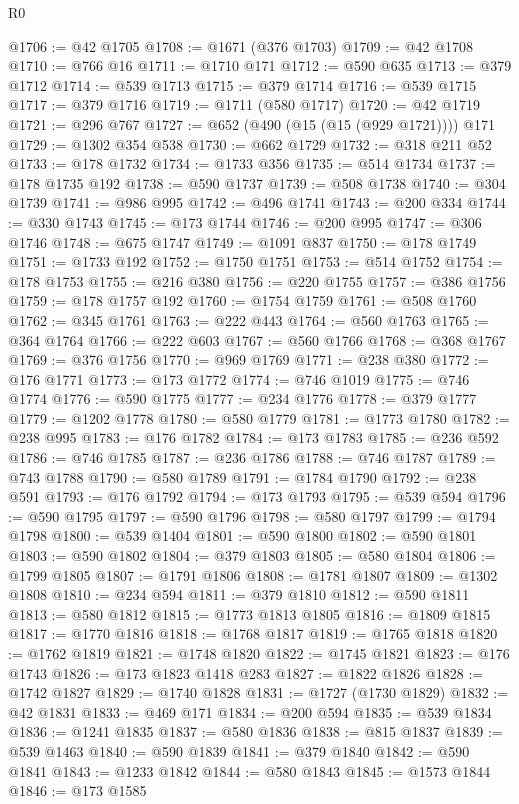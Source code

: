 \begin{lexlean}{R0}
\begin{coremodule}
@1706 := @42 @1705
@1708 := @1671 (@376 @1703)
@1709 := @42 @1708
@1710 := @766 @16
@1711 := @1710 @171
@1712 := @590 @635
@1713 := @379 @1712
@1714 := @539 @1713
@1715 := @379 @1714
@1716 := @539 @1715
@1717 := @379 @1716
@1719 := @1711 (@580 @1717)
@1720 := @42 @1719
@1721 := @296 @767
@1727 := @652 (@490 (@15 (@15 (@929 @1721)))) @171
@1729 := @1302 @354 @538
@1730 := @662 @1729
@1732 := @318 @211 @52
@1733 := @178 @1732
@1734 := @1733 @356
@1735 := @514 @1734
@1737 := @178 @1735 @192
@1738 := @590 @1737
@1739 := @508 @1738
@1740 := @304 @1739
@1741 := @986 @995
@1742 := @496 @1741
@1743 := @200 @334
@1744 := @330 @1743
@1745 := @173 @1744
@1746 := @200 @995
@1747 := @306 @1746
@1748 := @675 @1747
@1749 := @1091 @837
@1750 := @178 @1749
@1751 := @1733 @192
@1752 := @1750 @1751
@1753 := @514 @1752
@1754 := @178 @1753
@1755 := @216 @380
@1756 := @220 @1755
@1757 := @386 @1756
@1759 := @178 @1757 @192
@1760 := @1754 @1759
@1761 := @508 @1760
@1762 := @345 @1761
@1763 := @222 @443
@1764 := @560 @1763
@1765 := @364 @1764
@1766 := @222 @603
@1767 := @560 @1766
@1768 := @368 @1767
@1769 := @376 @1756
@1770 := @969 @1769
@1771 := @238 @380
@1772 := @176 @1771
@1773 := @173 @1772
@1774 := @746 @1019
@1775 := @746 @1774
@1776 := @590 @1775
@1777 := @234 @1776
@1778 := @379 @1777
@1779 := @1202 @1778
@1780 := @580 @1779
@1781 := @1773 @1780
@1782 := @238 @995
@1783 := @176 @1782
@1784 := @173 @1783
@1785 := @236 @592
@1786 := @746 @1785
@1787 := @236 @1786
@1788 := @746 @1787
@1789 := @743 @1788
@1790 := @580 @1789
@1791 := @1784 @1790
@1792 := @238 @591
@1793 := @176 @1792
@1794 := @173 @1793
@1795 := @539 @594
@1796 := @590 @1795
@1797 := @590 @1796
@1798 := @580 @1797
@1799 := @1794 @1798
@1800 := @539 @1404
@1801 := @590 @1800
@1802 := @590 @1801
@1803 := @590 @1802
@1804 := @379 @1803
@1805 := @580 @1804
@1806 := @1799 @1805
@1807 := @1791 @1806
@1808 := @1781 @1807
@1809 := @1302 @1808
@1810 := @234 @594
@1811 := @379 @1810
@1812 := @590 @1811
@1813 := @580 @1812
@1815 := @1773 @1813 @1805
@1816 := @1809 @1815
@1817 := @1770 @1816
@1818 := @1768 @1817
@1819 := @1765 @1818
@1820 := @1762 @1819
@1821 := @1748 @1820
@1822 := @1745 @1821
@1823 := @176 @1743
@1826 := @173 @1823 @1418 @283
@1827 := @1822 @1826
@1828 := @1742 @1827
@1829 := @1740 @1828
@1831 := @1727 (@1730 @1829)
@1832 := @42 @1831
@1833 := @469 @171
@1834 := @200 @594
@1835 := @539 @1834
@1836 := @1241 @1835
@1837 := @580 @1836
@1838 := @815 @1837
@1839 := @539 @1463
@1840 := @590 @1839
@1841 := @379 @1840
@1842 := @590 @1841
@1843 := @1233 @1842
@1844 := @580 @1843
@1845 := @1573 @1844
@1846 := @173 @1585

\end{coremodule}
\end{lexlean}
